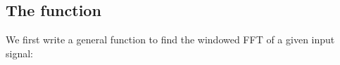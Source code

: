 \documentclass[11pt]{article}
\begin{document}
	

	
		
    \subsection{The function}\label{the-function}

We first write a general function to find the windowed FFT of a given
input signal:

	

	
		
	
	
		
	
		
			
		
	
		
			
		
	
		
			
		
	
		
			
		
	
		
			
		
	
		
			
		
	
		
			
		
	
		
			
		
	
		
			
		
	
		
			
		
	
		
			
		
	
		
			
		
	
		
			
		
	
		
			
		
	
		
			
		
	
		
			
		
	
		
			
		
	
		
			
		
	
		
			
		
	
		
			
		
	
		
			
		
	
		
			
\end{document}
